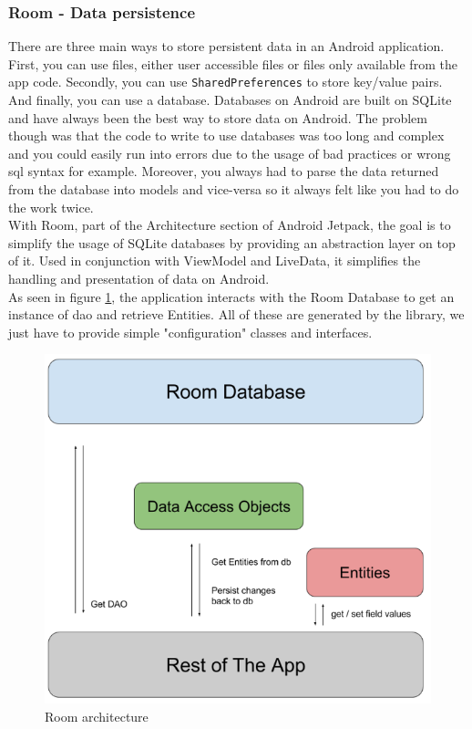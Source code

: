 \documentclass[twoside, openright,11pt,a4paper]{book}
\begin{document}
\subsubsection{Room - Data persistence}
There are three main ways to store persistent data in an Android application. First, you can use files, either user accessible files or files only available from the app code. Secondly, you can use \verb+SharedPreferences+ to store key/value pairs. And finally, you can use a database. Databases on Android are built on SQLite and have always been the best way to store data on Android. The problem though was that the code to write to use databases was too long and complex and you could easily run into errors due to the usage of bad practices or wrong \gls{sql} syntax for example. Moreover, you always had to parse the data returned from the database into models and vice-versa so it always felt like you had to do the work twice.\\

With Room\cite{android:doc:jetpack:room}, part of the Architecture section of Android Jetpack, the goal is to simplify the usage of SQLite databases by providing an abstraction layer on top of it. Used in conjunction with ViewModel and LiveData, it simplifies the handling and presentation of data on Android.\\

As seen in figure \ref{room_architecture_img}, the application interacts with the Room Database to get an instance of \gls{dao} and retrieve Entities. All of these are generated by the library, we just have to provide simple "configuration" classes and interfaces.\\
\begin{figure}[H]
\begin{center}
	\includegraphics[width=.8\textwidth]{assets/room_architecture}
	\caption[Room architecture]{Room architecture\cite{android:training:jetpack:room}}
	\label{room_architecture_img}
\end{center}
\end{figure}
\end{document}
